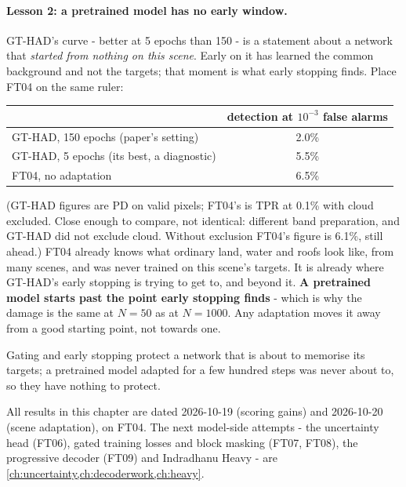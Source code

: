 \paragraph{Lesson 2: a pretrained model has no early window.}
GT-HAD's curve - better at 5 epochs than 150 - is a statement about a network that \emph{started from nothing on this scene}.
Early on it has learned the common background and not the targets; that moment is what early stopping finds. Place FT04 on
the same ruler:
\begin{center}
\small
\begin{tabular}{lc}
\toprule
 & detection at $10^{-3}$ false alarms \\
\midrule
GT-HAD, 150 epochs (paper's setting) & 2.0\% \\
GT-HAD, 5 epochs (its best, a diagnostic) & 5.5\% \\
FT04, no adaptation & 6.5\% \\
\bottomrule
\end{tabular}
\end{center}
(GT-HAD figures are PD on valid pixels; FT04's is TPR at 0.1\% with cloud excluded. Close enough to compare, not identical:
different band preparation, and GT-HAD did not exclude cloud. Without exclusion FT04's figure is 6.1\%, still ahead.) FT04
already knows what ordinary land, water and roofs look like, from many scenes, and was never trained on this scene's targets.
It is already where GT-HAD's early stopping is trying to get to, and beyond it. \textbf{A pretrained model starts past the
point early stopping finds} - which is why the damage is the same at $N = 50$ as at $N = 1000$. Any adaptation moves it away
from a good starting point, not towards one.

\begin{keypoint}
Gating and early stopping protect a network that is about to memorise its targets; a pretrained model adapted for a few
hundred steps was never about to, so they have nothing to protect.
\end{keypoint}

\begin{drift}
All results in this chapter are dated 2026-10-19 (scoring gains) and 2026-10-20 (scene adaptation), on FT04. The next
model-side attempts - the uncertainty head (FT06), gated training losses and block masking (FT07, FT08), the progressive
decoder (FT09) and Indradhanu Heavy - are \cref{ch:uncertainty,ch:decoderwork,ch:heavy}.
\end{drift}

